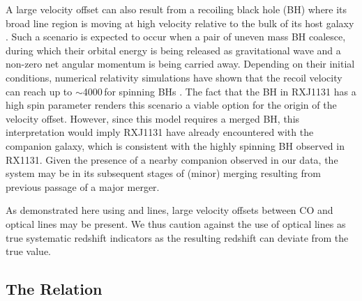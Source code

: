 \documentclass[]{emulateapj}
\begin{document}
A large velocity offset can also result from a recoiling black hole (BH) where its broad line region
is moving at high velocity relative to the bulk of its host galaxy 
\citep{Madau04a, Bonning07a, Loeb07a}. 
Such a scenario is expected to occur 
when a pair of uneven mass BH coalesce, during which their orbital energy is being released 
as gravitational wave and a 
non-zero net angular momentum is being carried away.
Depending on their initial conditions, numerical relativity simulations have shown that
the recoil velocity can reach up to $\sim$4000\,\kms for spinning BHs \citep[\eg][]{Campanelli07a}.
The fact that the BH in RXJ1131 has a high spin parameter \citep{Reis14a}
renders this scenario a viable option for the origin
of the velocity offset. 
However, since this model requires a merged BH, this interpretation would imply RXJ1131 have 
already encountered with the companion galaxy, which is consistent with
the highly spinning BH observed in RX1131.
Given the presence of a nearby companion observed in our data, the system may be in its 
subsequent stages of (minor) merging resulting from previous passage of a major merger.

As demonstrated here using \mgii and \oiii lines, large velocity offsets between CO and optical lines may be present.
We thus caution against the use of optical lines as 
true systematic redshift indicators as the resulting redshift can deviate from the 
true value.

\subsection{The \bhrelation Relation}
\end{document}
